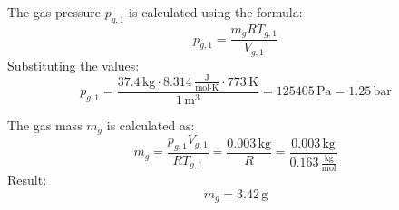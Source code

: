 The gas pressure \( p_{g,1} \) is calculated using the formula:  
\[
p_{g,1} = \frac{m_g R T_{g,1}}{V_{g,1}}
\]  
Substituting the values:  
\[
p_{g,1} = \frac{37.4 \, \text{kg} \cdot 8.314 \, \frac{\text{J}}{\text{mol·K}} \cdot 773 \, \text{K}}{1 \, \text{m}^3} = 125405 \, \text{Pa} = 1.25 \, \text{bar}
\]  

The gas mass \( m_g \) is calculated as:  
\[
m_g = \frac{p_{g,1} V_{g,1}}{R T_{g,1}} = \frac{0.003 \, \text{kg}}{R} = \frac{0.003 \, \text{kg}}{0.163 \, \frac{\text{kg}}{\text{mol}}}
\]  
Result:  
\[
m_g = 3.42 \, \text{g}
\]